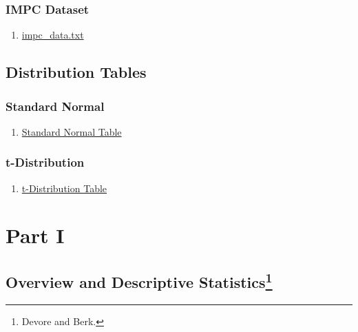 \documentclass[]{book}
\providecommand{\tightlist}{%
  \setlength{\itemsep}{0pt}\setlength{\parskip}{0pt}}
\let\rmarkdownfootnote\footnote%
\def\footnote{\protect\rmarkdownfootnote}
\theoremstyle{definition}
\theoremstyle{definition}
\theoremstyle{definition}
\theoremstyle{remark}
\begin{document}
\section{IMPC Dataset}\label{impc-dataset}

\begin{enumerate}
\def\labelenumi{\arabic{enumi}.}
\tightlist
\item
  \href{https://github.com/sahirbhatnagar/MATH697/blob/master/images/impc_data.txt}{impc\_data.txt}
\end{enumerate}

\chapter*{Distribution Tables}\label{distribution-tables}

\section{Standard Normal}\label{standard-normal}

\begin{enumerate}
\def\labelenumi{\arabic{enumi}.}
\tightlist
\item
  \href{https://github.com/sahirbhatnagar/MATH697/blob/master/images/Standard_Normal_Table.pdf}{Standard
  Normal Table}
\end{enumerate}

\section{t-Distribution}\label{t-distribution}

\begin{enumerate}
\def\labelenumi{\arabic{enumi}.}
\tightlist
\item
  \href{https://github.com/sahirbhatnagar/MATH697/blob/master/images/t_Table.pdf}{t-Distribution
  Table}
\end{enumerate}

\part{Part I}\label{part-part-i}

\chapter[Overview and Descriptive Statistics]{\texorpdfstring{Overview
and Descriptive Statistics\footnote{Devore and Berk.}}{Overview and Descriptive Statistics}}\label{intro}
\end{document}
